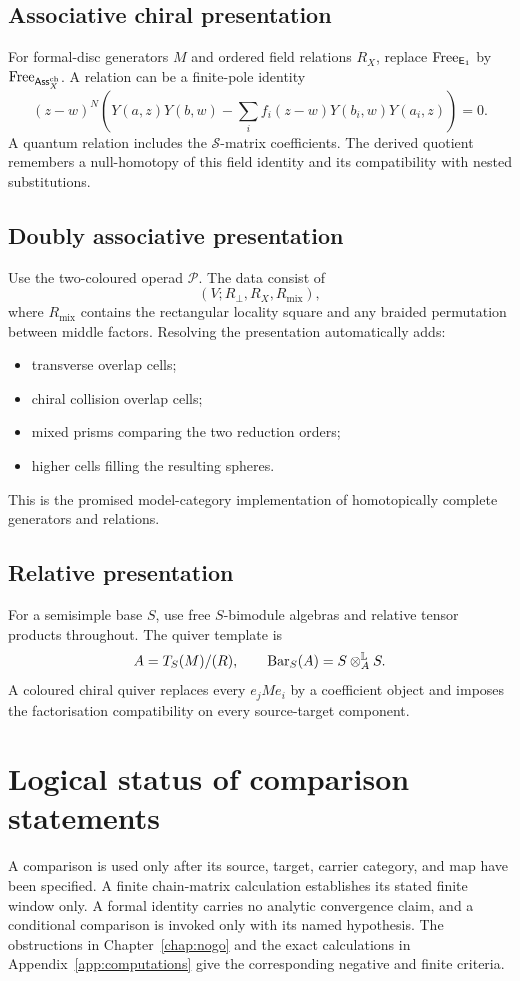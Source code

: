 \section{Associative chiral presentation}
For formal-disc generators \(M\) and ordered field relations \(R_X\), replace \(\operatorname{Free}_{\mathsf E_1}\) by \(\operatorname{Free}_{\mathsf{Ass}^{\mathrm{ch}}_X}\).  A relation can be a finite-pole identity
\[
 (z-w)^N\left(Y(a,z)Y(b,w)-\sum_i f_i(z-w)Y(b_i,w)Y(a_i,z)\right)=0.
\]
A quantum relation includes the \(\mathcal S\)-matrix coefficients.  The derived quotient remembers a null-homotopy of this field identity and its compatibility with nested substitutions.

\section{Doubly associative presentation}
Use the two-coloured operad \(\mathcal P\).  The data consist of
\[
 (V;R_\perp,R_X,R_{\mathrm{mix}}),
\]
where \(R_{\mathrm{mix}}\) contains the rectangular locality square and any braided permutation between middle factors.  Resolving the presentation automatically adds:
\begin{itemize}
\item transverse overlap cells;
\item chiral collision overlap cells;
\item mixed prisms comparing the two reduction orders;
\item higher cells filling the resulting spheres.
\end{itemize}
This is the promised model-category implementation of homotopically complete generators and relations.

\section{Relative presentation}
For a semisimple base \(S\), use free \(S\)-bimodule algebras and relative tensor products throughout.  The quiver template is
\[
 A=T_S(M)/(R),
 \qquad
 \operatorname{Bar}_S(A)=S\otimes_A^{\mathbb L}S.
\]
A coloured chiral quiver replaces every \(e_jMe_i\) by a coefficient object and imposes the factorisation compatibility on every source-target component.

\chapter{Logical status of comparison statements}\label{app:archive}

A comparison is used only after its source, target, carrier category, and map
have been specified.  A finite chain-matrix calculation establishes its stated
finite window only.  A formal identity carries no analytic convergence claim,
and a conditional comparison is invoked only with its named hypothesis.  The
obstructions in Chapter~\ref{chap:nogo} and the exact calculations in
Appendix~\ref{app:computations} give the corresponding negative and finite
criteria.

